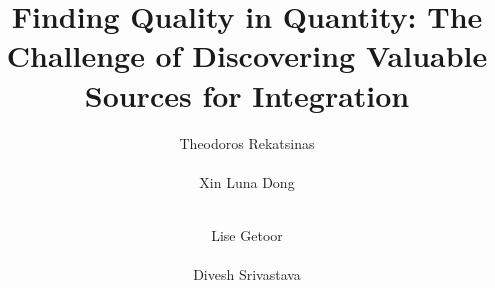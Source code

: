 \documentclass{sig-alternate}
\begin{document}
\title{Finding Quality in Quantity: The Challenge of Discovering Valuable Sources for Integration}


\author{
\alignauthor
Theodoros Rekatsinas\\
       \\
\alignauthor
Xin Luna Dong\\
       \\
 \and
\alignauthor
Lise Getoor\\
       \\
\alignauthor
Divesh Srivastava\\
       \\
}    
\end{document}
